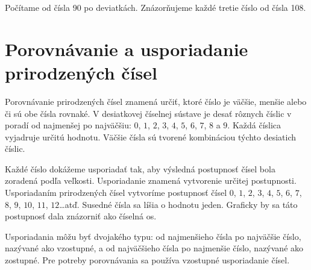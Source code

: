 \documentclass{report}
\begin{document}
\begin{center}
  Počítame od čísla 90 po deviatkách. Znázorňujeme každé tretie číslo od čísla 108. \vspace{5mm}

\end{center}

\section{Porovnávanie a usporiadanie prirodzených čísel}

Porovnávanie prirodzených čísel znamená určiť, ktoré číslo je väčšie, menšie alebo či sú obe čísla rovnaké. V desiatkovej číselnej sústave je desať rôznych číslic v poradí od najmenšej po najväčšiu: \(0\), \(1\), \(2\), \(3\), \(4\), \(5\), \(6\), \(7\), \(8\) a \(9\). Každá číslica vyjadruje určitú hodnotu. Väčšie čísla sú tvorené kombináciou týchto desiatich číslic.

Každé číslo dokážeme usporiadať tak, aby výsledná postupnosť čísel bola zoradená podľa veľkosti. Usporiadanie znamená vytvorenie určitej postupnosti. Usporiadaním prirodzených čísel vytvoríme postupnosť čísel \(0\), \(1\), \(2\), \(3\), \(4\), \(5\), \(6\), \(7\), \(8\), \(9\), \(10\), \(11\), \(12\)\dots atď. Susedné čísla sa líšia o hodnotu jeden. Graficky by sa táto postupnosť dala znázorniť ako číselná os.

\begin{center}
\end{center}

Usporiadania môžu byť dvojakého typu: od najmenšieho čísla po najväčšie číslo, nazývané ako vzostupné, a od najväčšieho čísla po najmenšie číslo, nazývané ako zostupné. Pre potreby porovnávania sa používa vzostupné usporiadanie čísel.
\end{document}
